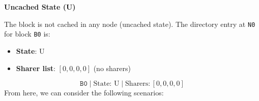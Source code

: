 \newpage

\begin{flushleft}
    \textcolor{Green3}{ \textbf{Uncached State (U)}}
\end{flushleft}
The block is not cached in any node (uncached state). The directory entry at \texttt{N0} for block \texttt{B0} is:
\begin{itemize}
    \item \textbf{State}: U
    \item \textbf{Sharer list}: $[0, 0, 0, 0]$ (no sharers)
\end{itemize}
\begin{equation*}
    \texttt{B0} \; | \; \text{State: U} \; | \; \text{Sharers:} \, \left[0, 0, 0, 0\right]
\end{equation*}
From here, we can consider the following scenarios:
